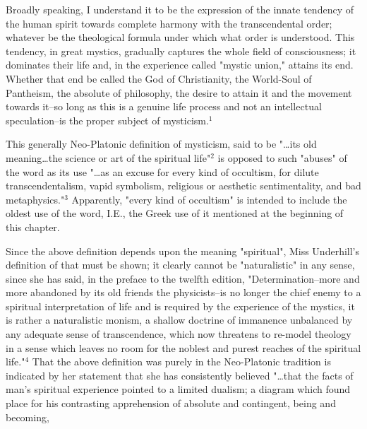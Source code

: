\begin{center}
	\parbox{0.8\textwidth}{
		\hspace*{5mm}Broadly speaking, I understand it to be the expression
		of the innate tendency of the human spirit towards complete
		harmony with the transcendental order; whatever be the theological
		formula under which what order is understood. This
		tendency, in great mystics, gradually captures the whole
		field of consciousness; it dominates their life and, in the
		experience called "mystic union," attains its end. Whether
		that end be called the God of Christianity, the World-Soul of
		Pantheism, the absolute of philosophy, the desire to attain it
		and the movement towards it--so long as this is a genuine
		life process and not an intellectual speculation--is the
		proper subject of mysticism.$^{1}$\par
	}%
\end{center}
\hspace*{5mm}This generally Neo-Platonic definition of mysticism, said to
be "\dots its old meaning\dots the science or art of the spiritual
life"$^{2}$ is opposed to such "abuses" of the word as its use
"\dots as an excuse for every kind of occultism, for dilute
transcendentalism, vapid symbolism, religious or aesthetic
sentimentality, and bad metaphysics."$^{3}$ Apparently, "every
kind of occultism" is intended to include the oldest use of
the word, I.E., the Greek use of it mentioned at the beginning
of this chapter.\par
\vspace*{0.5\baselineskip}
Since the above definition depends upon the meaning
"spiritual", Miss Underhill's definition of that must be
shown; it clearly cannot be "naturalistic" in any sense, since
she has said, in the preface to the twelfth edition, "Determination--more
and more abandoned by its old friends the physicists--is
no longer the chief enemy to a spiritual interpretation
of life and is required by the experience of the
mystics, it is rather a naturalistic monism, a shallow
doctrine of immanence unbalanced by any adequate sense of
transcendence, which now threatens to re-model theology in
a sense which leaves no room for the noblest and purest
reaches of the spiritual life."$^{4}$ That the above definition
was purely in the Neo-Platonic tradition is indicated by
her statement that she has consistently believed "\dots that
the facts of man's spiritual experience pointed to a limited
dualism; a diagram which found place for his contrasting
apprehension of absolute and contingent, being and becoming,
